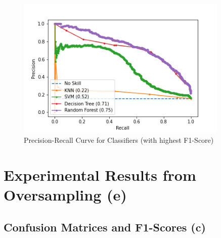 \documentclass{article}
\begin{document}
\begin{figure}[H]
\includegraphics[width=0.90\textwidth]{PRCurve}
\caption{Precision-Recall Curve for Classifiers (with highest F1-Score)}
\label{fig:prCurve}
\end{figure}

\section{Experimental Results from Oversampling (e)}

\subsection{Confusion Matrices and F1-Scores (c)}
\end{document}
